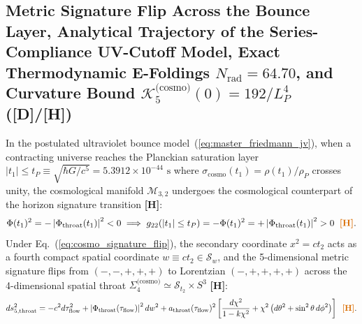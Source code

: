 \documentclass[11pt,a4paper]{article}
\newcommand{\catD}{\textbf{\textcolor{blue!75!black}{[D]}}}
\newcommand{\catH}{\textbf{\textcolor{orange!85!black}{[H]}}}
\theoremstyle{plain}
\theoremstyle{definition}
\theoremstyle{remark}
\numberwithin{equation}{section}
\begin{document}
\subsection{\texorpdfstring{Metric Signature Flip Across the Bounce Layer, Analytical Trajectory of the Series-Compliance UV-Cutoff Model, Exact Thermodynamic E-Foldings $N_{\text{rad}} = 64.70$, and Curvature Bound $\mathcal{K}_5^{\text{(cosmo)}}(0) = 192 / L_P^4$ (\catD/\catH)}{Metric Signature Flip Across the Bounce Layer, Analytical Trajectory of the UV-Cutoff Model, Exact Thermodynamic E-Foldings N_rad = 64.70, and Curvature Bound K_5(0) = 192 / L_P^4 ([D]/[H])}}

In the postulated ultraviolet bounce model~(\ref{eq:master_friedmann_jv}), when a contracting universe reaches the Planckian saturation layer $\lvert t_1 \rvert \le t_P \equiv \sqrt{\hbar G / c^5} = 5.3912 \times 10^{-44}\text{ s}$ where $\sigma_{\text{cosmo}}(t_1) = \rho(t_1)/\rho_P$ crosses unity, the cosmological manifold $\mathcal{M}_{3,2}$ undergoes the cosmological counterpart of the horizon signature transition \cite{jimenez2026b,sakharov1984} \catH:
\begin{equation}
\Phi(t_1)^2 = -\left\lvert \Phi_{\text{throat}}(t_1)\right\rvert^2 < 0 \implies g_{22}\!\left(\lvert t_1 \rvert \le t_P\right) = -\Phi(t_1)^2 = +\left\lvert \Phi_{\text{throat}}(t_1)\right\rvert^2 > 0 \;\;\catH.
\label{eq:cosmo_signature_flip}
\end{equation}
Under Eq.~(\ref{eq:cosmo_signature_flip}), the secondary coordinate $x^2 = c t_2$ acts as a fourth compact spatial coordinate $w \equiv c t_2 \in \mathcal{S}_w$, and the 5-dimensional metric signature flips from $(-,-,+,+,+)$ to Lorentzian $(-,+,+,+,+)$ across the 4-dimensional spatial throat $\Sigma_4^{\text{(cosmo)}} \simeq \mathcal{S}_{t_2} \times S^3$ \catH:
\begin{equation}
ds_{5,\text{throat}}^2 = -c^2 d\tau_{\text{flow}}^2 + \left\lvert \Phi_{\text{throat}}(\tau_{\text{flow}})\right\rvert^2 dw^2 + a_{\text{throat}}(\tau_{\text{flow}})^2 \left[ \frac{d\chi^2}{1 - k\chi^2} + \chi^2\left(d\theta^2 + \sin^2\theta\,d\phi^2\right) \right] \;\;\catH.
\label{eq:throat_5d_line_element}
\end{equation}
\end{document}
